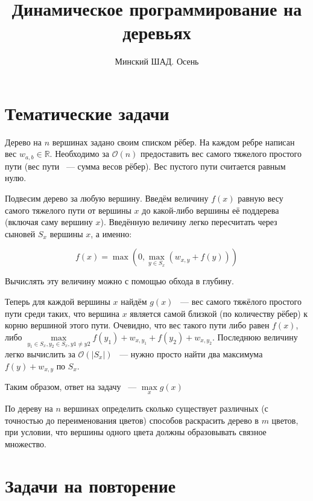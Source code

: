\documentclass[addpoints]{exam}
\title{Динамическое программирование на деревьях}
\author{Минский ШАД. Осень}
\begin{document}
\maketitle

\begin{questions}

\section{Тематические задачи}

\question[1] \label{task1} Дерево на $n$ вершинах задано своим списком рёбер. На каждом ребре написан вес $w_{a,b} \in \mathbb{R}$. Необходимо за $\mathcal{O}(n)$ предоставить вес самого тяжелого простого пути (вес пути ~--- сумма весов рёбер). Вес пустого пути считается равным нулю. 

\begin{solution}
Подвесим дерево за любую вершину. Введём величину $f(x)$ равную весу самого тяжелого пути от вершины $x$ до какой-либо вершины её поддерева (включая саму вершину $x$). Введённую величину легко пересчитать через сыновей $S_x$ вершины $x$, а именно: 

$$f(x) = \max\left(0, \max_{y \in S_x}(w_{x,y} + f(y))\right)$$

Вычислять эту величину можно с помощью обхода в глубину.

Теперь для каждой вершины $x$ найдём $g(x)$ ~--- вес самого тяжёлого простого пути среди таких, что вершина $x$ является самой близкой (по количеству рёбер) к корню вершиной этого пути. Очевидно, что вес такого пути либо равен $f(x)$, либо $\max\limits_{y_1 \in S_x, y_2 \in S_x, y1 \neq y2} f(y_1) + w_{x, y_1} + f(y_2) + w_{x, y_2}$. Последнюю величину легко вычислить за $\mathcal{O}(|S_x|)$ ~--- нужно просто найти два максимума $f(y) + w_{x, y}$ по $S_x$. 

Таким образом, ответ на задачу ~--- $\max\limits_x g(x)$

\end{solution}

\question[3] По дереву на $n$ вершинах определить сколько существует различных (с точностью до переименования цветов) способов раскрасить дерево в $m$ цветов, при условии, что вершины одного цвета должны образовывать связное множество.

\section{Задачи на повторение}


\end{questions}
\end{document}
